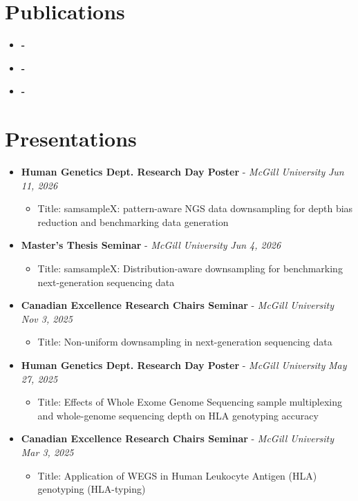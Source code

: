 \documentclass{article}
\newcommand{\experienceheader}[3]{\item \textbf{#1} - \textit{#2} \hfill \textit{#3} \vspace{-.2em}}
\newcommand{\customsection}[1]{\section*{#1} \vspace{-1em} \hrulefill \vspace{-.5em}}
\begin{document}


\customsection{Publications}
\begin{itemize}
  \item \textbf{-} 
  \item \textbf{-} 
  \item \textbf{-} 
\end{itemize}

\customsection{Presentations}
\begin{itemize}
  \experienceheader{Human Genetics Dept. Research Day Poster}{McGill University}{Jun 11, 2026}
  \begin{itemize}
    \item Title: samsample{X}: pattern-aware NGS data downsampling for depth bias reduction and benchmarking data generation
  \end{itemize}
  \experienceheader{Master's Thesis Seminar}{McGill University}{Jun 4, 2026}
  \begin{itemize}
    \item Title: samsample{X}: Distribution-aware downsampling for benchmarking next-generation sequencing data
  \end{itemize}
  \experienceheader{Canadian Excellence Research Chairs Seminar}{McGill University}{Nov 3, 2025}
  \begin{itemize}
    \item Title: Non-uniform downsampling in next-generation sequencing data
  \end{itemize}
  \experienceheader{Human Genetics Dept. Research Day Poster}{McGill University}{May 27, 2025}
  \begin{itemize}
    \item Title: Effects of Whole Exome Genome Sequencing sample multiplexing and whole-genome sequencing depth on HLA genotyping accuracy
  \end{itemize}
\experienceheader{Canadian Excellence Research Chairs Seminar}{McGill University}{Mar 3, 2025}
  \begin{itemize}
    \item Title: Application of WEGS in Human Leukocyte Antigen (HLA) genotyping (HLA-typing)
  \end{itemize}

\end{itemize}
\end{document}
